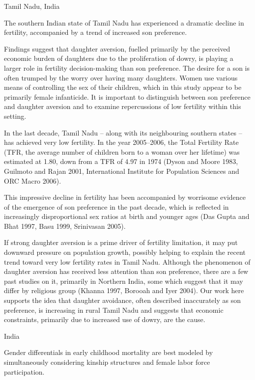 \citep{DiamondSmith2008}

Tamil Nadu, India

The southern Indian state of Tamil Nadu has experienced a dramatic decline in fertility, accompanied by a trend of increased son preference.

Findings suggest that daughter aversion, fuelled primarily by the perceived economic burden of daughters due to the proliferation of dowry, is playing a larger role in fertility decision-making than son preference. The desire for a son is often trumped by the worry over having many daughters. Women use various means of controlling the sex of their children, which in this study appear to be primarily female infanticide. It is important to distinguish between son preference and daughter aversion and to examine repercussions of low fertility within this setting.

In the last decade, Tamil Nadu – along with its neighbouring southern states – has achieved very low fertility. In the year 2005–2006, the Total Fertility Rate (TFR, the average number of children born to a woman over her lifetime) was estimated at 1.80, down from a TFR of 4.97 in 1974 (Dyson and Moore 1983, Guilmoto and Rajan 2001, International Institute for Population Sciences and ORC Macro 2006).

This impressive decline in fertility has been accompanied by worrisome evidence of the emergence of son preference in the past decade, which is reflected in increasingly disproportional sex ratios at birth and younger ages (Das Gupta and Bhat 1997, Basu 1999, Srinivasan 2005).

If strong daughter aversion is a prime driver of fertility limitation, it may put downward pressure on population growth, possibly helping to explain the recent trend toward very low fertility rates in Tamil Nadu. Although the phenomenon of daughter aversion has received less attention than son preference, there are a few past studies on it, primarily in Northern India, some which suggest that it may differ by religious group (Khanna 1997, Borooah and Iyer 2004). Our work here supports the idea that daughter avoidance, often described inaccurately as son preference, is increasing in rural Tamil Nadu and suggests that economic constraints, primarily due to increased use of dowry, are the cause.

\citep{Kishor1993}

India

Gender differentials in early childhood
mortality are best modeled by simultaneously
considering kinship structures and female labor force participation.

